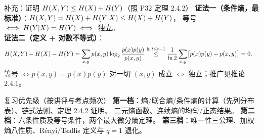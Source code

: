 \begin{example}{补充：证明 $H\!\left(X,Y\right)\le H\!\left(X\right)+H\!\left(Y\right)$（照 P32 定理 2.4.2）}
\textbf{证法一（条件熵，最标准）}：$H\!\left(X,Y\right)=H\!\left(X\right)+H\!\left(Y|X\right)\le H\!\left(X\right)+H\!\left(Y\right)$，
等号 $\iff H\!\left(Y|X\right)=H\!\left(Y\right)\iff$ 独立。\\
\textbf{证法二（定义 + 对数不等式）}：
\begin{align*}
H\!\left(X,Y\right)-H\!\left(X\right)-H\!\left(Y\right)
&=\sum_{x,y}p(x,y)\log_{2}\frac{p(x)p(y)}{p(x,y)}
\overset{\ln t\le t-1}{\le}\frac{1}{\ln2}\sum_{x,y}\bigl[p(x)p(y)-p(x,y)\bigr]=0 .
\end{align*}
等号 $\iff p(x,y)=p(x)p(y)$ 对一切 $(x,y)$ 成立 $\iff$ 独立；推广见推论 2.4.1。
\end{example}

\begin{warning}{复习优先级（按讲评与考点频次）}
\textbf{第一档}：熵/联合熵/条件熵的计算（先列分布表）、链式法则、定理 2.4.2 证明、
二元熵函数、连续熵的均匀/正态结果。\quad
\textbf{第二档}：六条性质及等号条件，两个最大微分熵定理。\quad
\textbf{第三档}：唯一性三公理、加权熵八性质、Rényi/Tsallis 定义与 $q=1$ 退化。
\end{warning}
